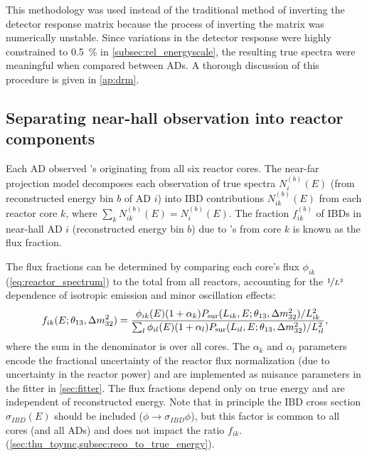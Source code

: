 This methodology was used instead of the traditional method of
inverting the detector response matrix
because the process of inverting the matrix was numerically unstable.
Since variations in the detector response were highly constrained
to \SI{0.5}{\percent} in \cref{subsec:rel_energyscale},
the resulting true \nuebar{} spectra were meaningful when compared between ADs.
A thorough discussion of this procedure is given in \cref{ap:drm}.

\subsection{Separating near-hall observation into reactor components}
\label{subsec:flux_fraction}

Each AD observed \nuebar{}'s originating from all six reactor cores.
The near-far projection model decomposes each observation
of true \nuebar{} spectra $N_i^{(b)}(E)$
(from reconstructed energy bin $b$ of AD $i$)
into IBD contributions $N_{ik}^{(b)}(E)$ from each reactor core $k$,
where $\sum_k N_{ik}^{(b)}(E) = N_i^{(b)}(E)$.
The fraction $f_{ik}^{(b)}$ of IBDs in near-hall AD $i$
(reconstructed energy bin $b$)
due to \nuebar{}'s from core $k$ is known as the flux fraction.

The flux fractions can be determined
by comparing each core's \nuebar{} flux $\phi_{ik}$ (\cref{eq:reactor_spectrum})
to the total from all reactors,
accounting for the $\nicefrac{1}{L^2}$ dependence of isotropic \nuebar{} emission
and minor oscillation effects:
\begin{equation}\label{eq:flux_fraction}
    f_{ik}(E;\theta_{13},\Delta m^2_{32}) = \frac{
        \phi_{ik}(E)(1+\alpha_k) P_\text{sur} (L_{ik}, E;\theta_{13},\Delta m^2_{32})/L_{ik}^2
    }{
    \sum_l \phi_{il}(E)(1+\alpha_l)P_\text{sur}(L_{il}, E;\theta_{13},\Delta m^2_{32})/L_{il}^2
    },
\end{equation}
where the sum in the denominator is over all cores.
The $\alpha_k$ and $\alpha_l$ parameters
encode the fractional uncertainty of the reactor flux normalization
(due to uncertainty in the reactor power)
and are implemented as nuisance parameters in the fitter in \cref{sec:fitter}.
The flux fractions depend only on true \nuebar{} energy
and are independent of reconstructed energy.
Note that in principle the IBD cross section $\sigma_{IBD}(E)$
should be included ($\phi \to \sigma_{IBD}\phi$),
but this factor is common to all cores (and all ADs)
and does not impact the ratio $f_{ik}$.
(\cref{sec:thu_toymc,subsec:reco_to_true_energy}).

